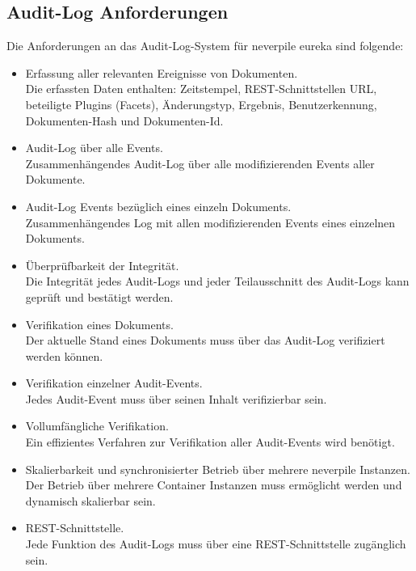 \subsection{Audit-Log Anforderungen}
Die Anforderungen an das Audit-Log-System für neverpile eureka sind folgende:
\begin{itemize}
\item Erfassung aller relevanten Ereignisse von Dokumenten.\\
Die erfassten Daten enthalten: Zeitstempel, \acs{REST}-Schnittstellen URL, beteiligte Plugins (Facets), Änderungstyp, Ergebnis, Benutzerkennung, Dokumenten-Hash und Dokumenten-Id.
\item Audit-Log über alle Events.\\
Zusammenhängendes Audit-Log über alle modifizierenden Events aller Dokumente.
\item Audit-Log Events bezüglich eines einzeln Dokuments.\\
Zusammenhängendes Log mit allen modifizierenden Events eines einzelnen Dokuments.
\item Überprüfbarkeit der Integrität.\\
Die Integrität jedes Audit-Logs und jeder Teilausschnitt des Audit-Logs kann geprüft und bestätigt werden.
\item Verifikation eines Dokuments.\\
Der aktuelle Stand eines Dokuments muss über das Audit-Log verifiziert werden können.
\item Verifikation einzelner Audit-Events.\\
Jedes Audit-Event muss über seinen Inhalt verifizierbar sein.
\item Vollumfängliche Verifikation.\\
Ein effizientes Verfahren zur Verifikation aller Audit-Events wird benötigt.
\item Skalierbarkeit und synchronisierter Betrieb über mehrere neverpile Instanzen.\\
Der Betrieb über mehrere Container Instanzen muss ermöglicht werden und dynamisch skalierbar sein.
\item \acs{REST}-Schnittstelle.\\
Jede Funktion des Audit-Logs muss über eine \acs{REST}-Schnittstelle zugänglich sein.
\end{itemize}
